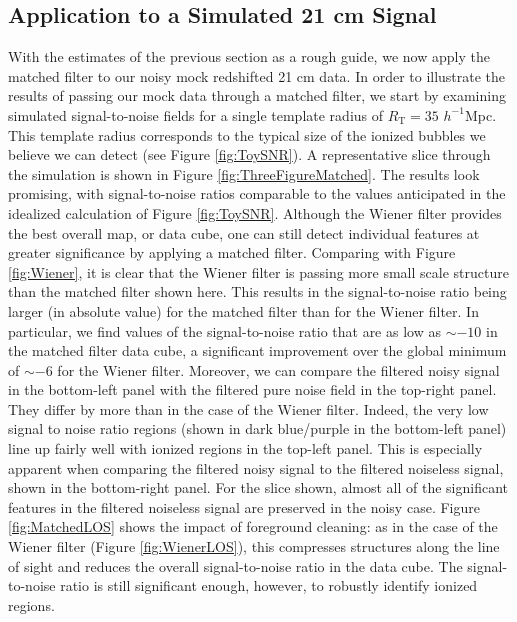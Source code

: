 \subsection{Application to a Simulated 21 cm Signal} \label{sec:mapplied}

With the estimates of the previous section as a rough guide, we now
apply the matched filter to our noisy mock redshifted 21 cm data.
In order to illustrate the results of passing our mock data through
a matched filter, we start by examining simulated signal-to-noise fields
for a single template radius of $R_{\text{T}} = 35$ $h^{-1}$Mpc. This template
radius corresponds to the typical size of the ionized bubbles we believe
we can detect (see Figure \ref{fig:ToySNR}). A representative slice
through the simulation is shown in Figure \ref{fig:ThreeFigureMatched}.
The results look promising, with signal-to-noise ratios comparable
to the values anticipated in the idealized calculation of Figure \ref{fig:ToySNR}. 
Although the Wiener filter provides
the best overall map, or data cube, one can still detect individual features at greater
significance by applying a matched filter.
Comparing
with Figure \ref{fig:Wiener}, it is clear that the Wiener filter is
passing more small scale structure than the matched filter shown here.
This results in the signal-to-noise ratio being larger (in absolute value) 
for the matched filter than for the Wiener filter.
In particular, we find values
of the signal-to-noise ratio that are as low as $\sim -10$ in the matched filter data cube, a significant improvement over the global minimum 
of $\sim -6$ for the Wiener filter.
Moreover, we can compare the filtered noisy signal in the bottom-left panel
with the filtered pure noise field in the top-right panel. They differ by
more than in the case of the Wiener filter. Indeed, the very low signal to noise
ratio regions (shown in dark blue/purple in the bottom-left panel) line up fairly well
with ionized regions in the top-left panel. This is especially apparent when comparing the filtered noisy signal to the filtered noiseless signal, shown in the bottom-right panel. For the slice shown, almost all of the significant features in the filtered noiseless signal are preserved in the noisy case. Figure \ref{fig:MatchedLOS}
shows the impact of foreground cleaning: as in the case of the Wiener filter (Figure \ref{fig:WienerLOS}),
this compresses structures along the line of sight and reduces the overall
signal-to-noise ratio in the data cube. The signal-to-noise ratio is still 
significant enough,
however, to robustly identify ionized regions.

